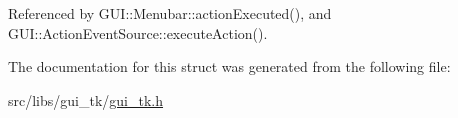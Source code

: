 Referenced by G\-U\-I\-::\-Menubar\-::action\-Executed(), and G\-U\-I\-::\-Action\-Event\-Source\-::execute\-Action().



The documentation for this struct was generated from the following file\-:\begin{DoxyCompactItemize}
\item 
src/libs/gui\-\_\-tk/\hyperlink{gui__tk_8h}{gui\-\_\-tk.\-h}\end{DoxyCompactItemize}
